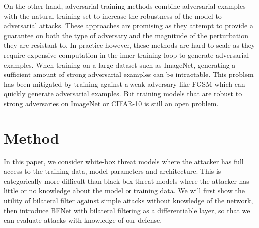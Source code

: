 \documentclass{article} %
\begin{document}
On the other hand, adversarial training methods \citep{goodfellow2015explaining,madry2017towards,shaham2018understanding,tramer2017ensemble} combine adversarial examples with the natural training set to increase the robustness of the model to adversarial attacks. These approaches are promising as they attempt to provide a guarantee on both the type of adversary and the magnitude of the perturbation they are resistant to. In practice however, these methods are hard to scale as they require expensive computation in the inner training loop to generate adversarial examples. When training on a large dataset such as ImageNet, generating a sufficient amount of strong adversarial examples can be intractable. This problem has been mitigated by training against a weak adversary like FGSM \citep{tramer2017ensemble} which can quickly generate adversarial examples. But training models that are robust to strong adversaries on ImageNet or CIFAR-10 is still an open problem. 

\section{Method}

In this paper, we consider white-box threat models where the attacker has full access to the training data, model parameters and architecture. This is categorically more difficult than black-box threat models where the attacker has little or no knowledge about the model or training data. We will first show the utility of bilateral filter against simple attacks without knowledge of the network, then introduce BFNet with bilateral filtering as a differentiable layer, so that we can evaluate attacks with knowledge of our defense.
\end{document}
